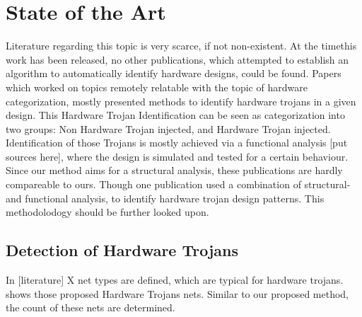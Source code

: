 
\section{State of the Art}
Literature regarding this topic is very scarce, if not non-existent. At the timethis work has been released, no other publications, which attempted to establish 
an algorithm to automatically identify hardware designs, could be found.
Papers which worked on topics remotely relatable with the topic of hardware 
categorization, mostly presented methods to identify hardware trojans in a given 
design. This Hardware Trojan Identification can be seen as categorization into 
two groups: Non Hardware Trojan injected, and Hardware Trojan injected.
Identification of those Trojans is mostly achieved via a functional analysis [put sources here], where the design is simulated and tested for a certain
behaviour. Since our method aims for a structural analysis, these publications 
are hardly compareable to ours. Though one publication used a combination of structural- and 
functional analysis, to identify hardware trojan design patterns. This 
methodolodogy should be further looked upon.  

\subsection{Detection of Hardware Trojans}
In [literature] X net types are defined, which are typical for hardware trojans.
\label{hwTrojanNets} shows those proposed Hardware Trojans nets. Similar to 
our proposed method, the count of these nets are determined. 
 
